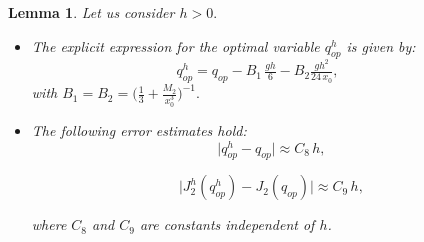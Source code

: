 \documentclass[11pt]{article}
\newtheorem{Lemma}{Lemma}
\begin{document}
\begin{Lemma} Let us consider $h>0.$
    
     \begin{itemize}
      \item[(a)]  The explicit expression for the optimal variable ${q^h_{op}} $ is given by:     
     \begin{equation}\label{qhop}
      {q^h_{op}} =q_{op} - B_1 \,\tfrac{g h}{6} - B_2 \tfrac{g h^2}{24\,x_0} , \qquad 
     \end{equation}
     with   $B_1=B_2=\Big(\tfrac{1}{3} + \tfrac{M_2}{x_0^3}\Big)^{-1}.$
     
     \noindent 
     
      \item[(b)]The following error estimates hold:
     		\begin{equation}\label{qhop-qoo}
     		\lvert {q^h_{op}} - q_{op} \rvert \approx C_8 \, h  ,
     		\end{equation}
     	
     		\begin{equation}\label{J2hqhop-J2qop}
     	    \Big \lvert  {J^h_2}({q^h_{op}}) -  J_{2}(q_{op}) \Big \rvert \approx C_9 \, h,
     	    \end{equation}
     		
        where $C_8$  and $C_9$ are  constants independent of $h$.
     
     \end{itemize}
    \end{Lemma}
    
    
    
\end{document}
